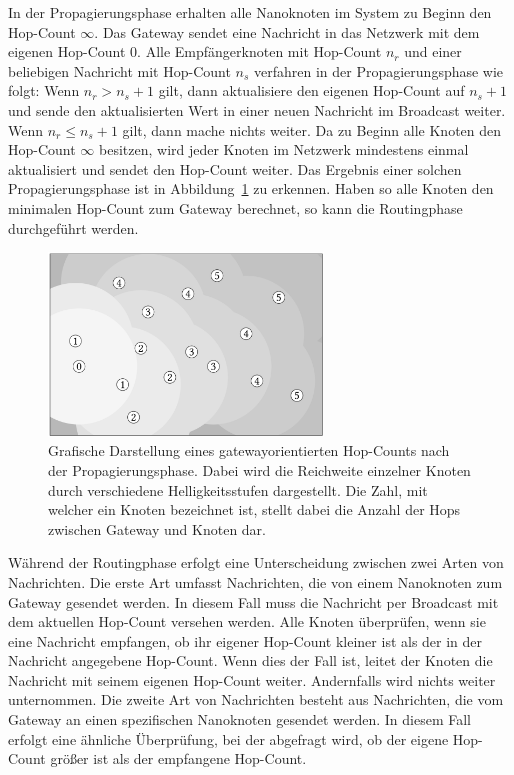 In der Propagierungsphase erhalten alle Nanoknoten im System zu Beginn den Hop-Count $\infty$. Das Gateway sendet eine Nachricht in das Netzwerk mit dem eigenen Hop-Count $0$. Alle Empfängerknoten mit Hop-Count $n_r$ und einer beliebigen Nachricht mit Hop-Count $n_s$ verfahren in der Propagierungsphase wie folgt: Wenn $n_r > n_s + 1$ gilt, dann aktualisiere den eigenen Hop-Count auf $n_s + 1$ und sende den aktualisierten Wert in einer neuen Nachricht im Broadcast weiter. Wenn $n_r \leq n_s + 1$ gilt, dann mache nichts weiter. Da zu Beginn alle Knoten den Hop-Count $\infty$ besitzen, wird jeder Knoten im Netzwerk mindestens einmal aktualisiert und sendet den Hop-Count weiter. Das Ergebnis einer solchen Propagierungsphase ist in Abbildung~\ref{fig:hop-count} zu erkennen. Haben so alle Knoten den minimalen Hop-Count zum Gateway berechnet, so kann die Routingphase durchgeführt werden. 

\begin{figure}
    \centering
    \includegraphics[width=0.65\textwidth]{images/Hop-Count.png}
    \caption[Grafische Darstellung eines gatewayorientierten Hop-Counts]{Grafische Darstellung eines gatewayorientierten Hop-Counts nach der Propagierungsphase. Dabei wird die Reichweite einzelner Knoten durch verschiedene Helligkeitsstufen dargestellt. Die Zahl, mit welcher ein Knoten bezeichnet ist, stellt dabei die Anzahl der Hops zwischen Gateway und Knoten dar.}
    \label{fig:hop-count}
\end{figure}

Während der Routingphase erfolgt eine Unterscheidung zwischen zwei Arten von Nachrichten. Die erste Art umfasst Nachrichten, die von einem Nanoknoten zum Gateway gesendet werden. In diesem Fall muss die Nachricht per Broadcast mit dem aktuellen Hop-Count versehen werden. Alle Knoten überprüfen, wenn sie eine Nachricht empfangen, ob ihr eigener Hop-Count kleiner ist als der in der Nachricht angegebene Hop-Count. Wenn dies der Fall ist, leitet der Knoten die Nachricht mit seinem eigenen Hop-Count weiter. Andernfalls wird nichts weiter unternommen. Die zweite Art von Nachrichten besteht aus Nachrichten, die vom Gateway an einen spezifischen Nanoknoten gesendet werden. In diesem Fall erfolgt eine ähnliche Überprüfung, bei der abgefragt wird, ob der eigene Hop-Count größer ist als der empfangene Hop-Count.

